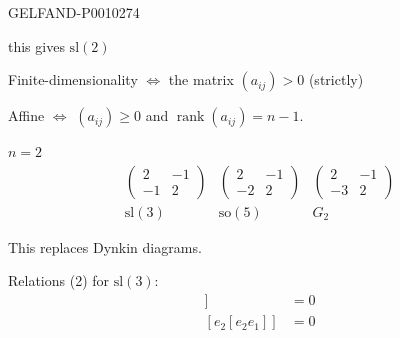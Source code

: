 \begin{GelfandAdjacentEvidence}{GELFAND-P001027}{4}


this gives $\mathrm{sl}(2)$
\end{GelfandAdjacentEvidence}


Finite-dimensionality $\Leftrightarrow$ the matrix $(a_{ij})>0$ (strictly)

Affine $\Leftrightarrow$ $(a_{ij})\ge0$ and $\operatorname{rank}(a_{ij})=n-1$.

\underline{$n=2$}
\[
\begin{array}{ccc}
\begin{pmatrix}2&-1\\-1&2\end{pmatrix}&
\begin{pmatrix}2&-1\\-2&2\end{pmatrix}&
\begin{pmatrix}2&-1\\-3&2\end{pmatrix}\\
\mathrm{sl}(3)&\mathrm{so}(5)&G_2
\end{array}
\]

This replaces Dynkin diagrams.

Relations (2) for $\mathrm{sl}(3)$:
\begin{align*}
[e_1[e_1e_2]]&=0\\
[e_2[e_2e_1]]&=0
\end{align*}



